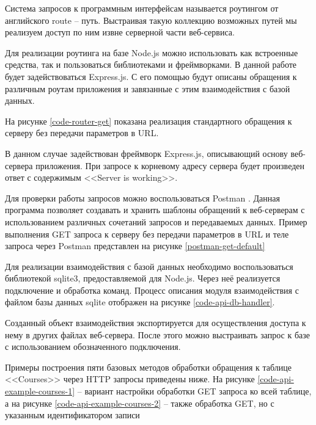 Система запросов к программным интерфейсам называется роутингом от английского route -- путь.
Выстраивая такую коллекцию возможных путей мы реализуем доступ по ним извне серверной части веб-сервиса.

Для реализации роутинга на базе Node.js можно использовать как встроенные средства, так и пользоваться библиотеками и фреймворками.
В данной работе будет задействоваться Express.js.
С его помощью будут описаны обращения к различным роутам приложения и завязанные с этим взаимодействия с базой данных.

На рисунке \ref{code-router-get} показана реализация стандартного обращения к серверу без передачи параметров в URL.


В данном случае задействован фреймворк Express.js, описывающий основу веб-сервера приложения.
При запросе к корневому адресу сервера будет произведен ответ с содержимым <<Server is working>>.

Для проверки работы запросов можно воспользоваться Postman \cite{postman}.
Данная программа позволяет создавать и хранить шаблоны обращений к веб-серверам с использованием различных сочетаний запросов и передаваемых данных.
Пример выполнения GET запроса к серверу без передачи параметров в URL и теле запроса через Postman представлен на рисунке \ref{postman-get-default}


Для реализации взаимодействия с базой данных необходимо воспользоваться библиотекой sqlite3, предоставляемой для Node.js.
Через неё реализуется подключение и обработка команд.
Процесс описания модуля взаимодействия с файлом базы данных sqlite отображен на рисунке \ref{code-api-db-handler}.


Созданный объект взаимодействия экспортируется для осуществления доступа к нему в других файлах веб-сервера.
После этого можно выстраивать запрос к базе с использованием обозначенного подключения.

Примеры построения пяти базовых методов обработки обращения к таблице <<Courses>> через HTTP запросы приведены ниже.
На рисунке \ref{code-api-example-courses-1} -- вариант настройки обработки GET запроса ко всей таблице, а на рисунке \ref{code-api-example-courses-2} -- также обработка GET, но с указанным идентификатором записи

